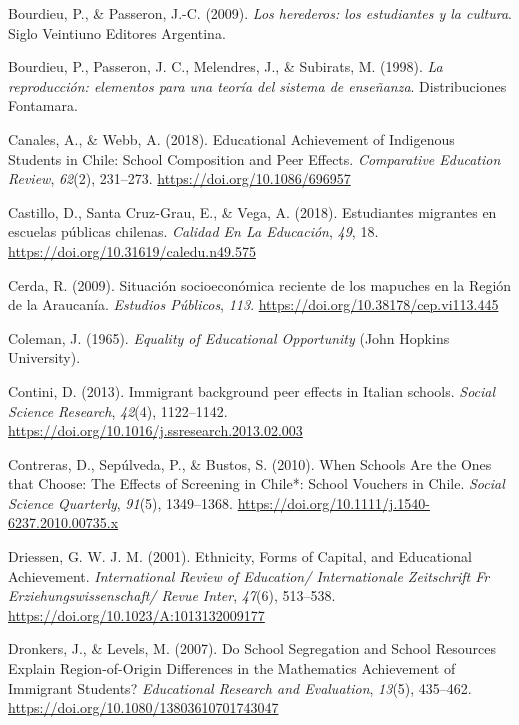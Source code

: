 \documentclass[
]{article}
\begin{document}
\leavevmode\hypertarget{ref-bourdieu_herederos_2009}{}%
Bourdieu, P., \& Passeron, J.-C. (2009). \emph{Los herederos: los
estudiantes y la cultura}. Siglo Veintiuno Editores Argentina.

\leavevmode\hypertarget{ref-bourdieu_reproduccion_1998}{}%
Bourdieu, P., Passeron, J. C., Melendres, J., \& Subirats, M. (1998).
\emph{La reproducción: elementos para una teoría del sistema de
enseñanza}. Distribuciones Fontamara.

\leavevmode\hypertarget{ref-canales_educational_2018}{}%
Canales, A., \& Webb, A. (2018). Educational Achievement of Indigenous
Students in Chile: School Composition and Peer Effects.
\emph{Comparative Education Review}, \emph{62}(2), 231--273.
\url{https://doi.org/10.1086/696957}

\leavevmode\hypertarget{ref-castillo_estudiantes_2018}{}%
Castillo, D., Santa Cruz-Grau, E., \& Vega, A. (2018). Estudiantes
migrantes en escuelas públicas chilenas. \emph{Calidad En La Educación},
\emph{49}, 18. \url{https://doi.org/10.31619/caledu.n49.575}

\leavevmode\hypertarget{ref-cerda_situacion_2009}{}%
Cerda, R. (2009). Situación socioeconómica reciente de los mapuches en
la Región de la Araucanía. \emph{Estudios Públicos}, \emph{113}.
\url{https://doi.org/10.38178/cep.vi113.445}

\leavevmode\hypertarget{ref-coleman_equality_1965}{}%
Coleman, J. (1965). \emph{Equality of Educational Opportunity} (John
Hopkins University).

\leavevmode\hypertarget{ref-contini_immigrant_2013}{}%
Contini, D. (2013). Immigrant background peer effects in Italian
schools. \emph{Social Science Research}, \emph{42}(4), 1122--1142.
\url{https://doi.org/10.1016/j.ssresearch.2013.02.003}

\leavevmode\hypertarget{ref-contreras_when_2010}{}%
Contreras, D., Sepúlveda, P., \& Bustos, S. (2010). When Schools Are the
Ones that Choose: The Effects of Screening in Chile*: School Vouchers in
Chile. \emph{Social Science Quarterly}, \emph{91}(5), 1349--1368.
\url{https://doi.org/10.1111/j.1540-6237.2010.00735.x}

\leavevmode\hypertarget{ref-driessen_ethnicity_2001}{}%
Driessen, G. W. J. M. (2001). Ethnicity, Forms of Capital, and
Educational Achievement. \emph{International Review of Education/
Internationale Zeitschrift Fr Erziehungswissenschaft/ Revue Inter},
\emph{47}(6), 513--538. \url{https://doi.org/10.1023/A:1013132009177}

\leavevmode\hypertarget{ref-dronkers_school_2007}{}%
Dronkers, J., \& Levels, M. (2007). Do School Segregation and School
Resources Explain Region-of-Origin Differences in the Mathematics
Achievement of Immigrant Students? \emph{Educational Research and
Evaluation}, \emph{13}(5), 435--462.
\url{https://doi.org/10.1080/13803610701743047}
\end{document}
